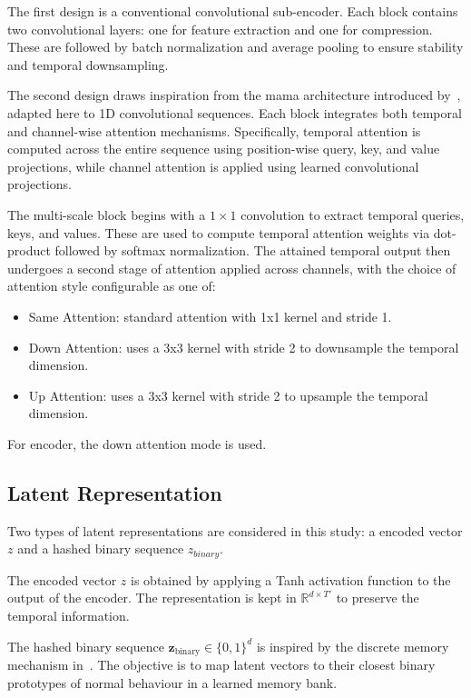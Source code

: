 The first design is a conventional convolutional sub-encoder.
Each block contains two convolutional layers: one for feature extraction and one for compression.
These are followed by batch normalization and average pooling to ensure stability and temporal downsampling.

The second design draws inspiration from the \gls{mama} architecture introduced by~\citet{chen_mama_2021}, adapted here to 1D convolutional sequences.
Each block integrates both temporal and channel-wise attention mechanisms.
Specifically, temporal attention is computed across the entire sequence using position-wise query, key, and value projections, while channel attention is applied using learned convolutional projections.

The multi-scale block begins with a $1 \times 1$ convolution to extract temporal queries, keys, and values.
These are used to compute temporal attention weights via dot-product followed by softmax normalization.
The attained temporal output then undergoes a second stage of attention applied across channels, with the choice of attention style configurable as one of:
\begin{itemize}
    \item Same Attention: standard attention with 1x1 kernel and stride 1.
    \item Down Attention: uses a 3x3 kernel with stride 2 to downsample the temporal dimension.
    \item Up Attention: uses a 3x3 kernel with stride 2 to upsample the temporal dimension.
\end{itemize}
For encoder, the down attention mode is used.


\subsection{Latent Representation}
\label{subsec:latent}
Two types of latent representations are considered in this study: a encoded vector $z$ and a hashed binary sequence $z_{binary}$.

The encoded vector $z$ is obtained by applying a Tanh activation function to the output of the encoder.
The representation is kept in $\mathbb{R}^{d \times T'}$ to preserve the temporal information.

The hashed binary sequence $\mathbf{z}_{\text{binary}} \in \{0,1\}^{d}$ is inspired by the discrete memory mechanism in~\citet{chen_mama_2021}.
The objective is to map latent vectors to their closest binary prototypes of normal behaviour in a learned memory bank.

